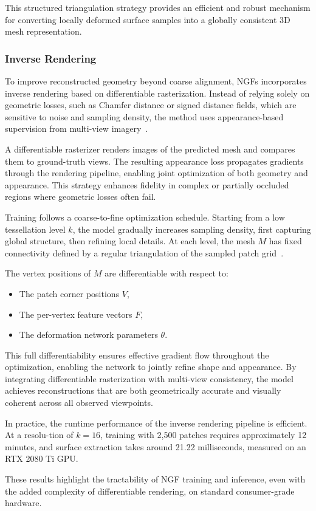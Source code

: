 This structured triangulation strategy provides an efficient and robust mechanism for converting locally deformed surface samples into a globally consistent 3D mesh representation.

\subsubsection{Inverse Rendering}

To improve reconstructed geometry beyond coarse alignment, NGFs incorporates inverse rendering based on differentiable rasterization.
Instead of relying solely on geometric losses, such as Chamfer distance or signed distance fields, which are sensitive to noise and sampling density, the method uses appearance-based supervision from multi-view imagery~\cite{Hasselgren2021}.

A differentiable rasterizer renders images of the predicted mesh and compares them to ground-truth views.
The resulting appearance loss propagates gradients through the rendering pipeline, enabling joint optimization of both geometry and appearance.
This strategy enhances fidelity in complex or partially occluded regions where geometric losses often fail.

Training follows a coarse-to-fine optimization schedule.
Starting from a low tessellation level $k$, the model gradually increases sampling density, first capturing global structure, then refining local details.
At each level, the mesh $M$ has fixed connectivity defined by a regular triangulation of the sampled patch grid~\cite{sivaram2024}.

The vertex positions of $M$ are differentiable with respect to:
\begin{itemize}
    \item The patch corner positions $V$,
    \item The per-vertex feature vectors $F$,
    \item The deformation network parameters $\theta$.
\end{itemize}

This full differentiability ensures effective gradient flow throughout the optimization, enabling the network to jointly refine shape and appearance.
By integrating differentiable rasterization with multi-view consistency, the model achieves reconstructions that are both geometrically accurate and visually coherent across all observed viewpoints.

In practice, the runtime performance of the inverse rendering pipeline is efficient. 
At a resolu-tion of $k = 16$, training with 2,500 patches requires approximately 12 minutes, and surface extraction takes around 21.22 milliseconds, measured on an RTX 2080 Ti GPU.

These results highlight the tractability of NGF training and inference, even with the added complexity of differentiable rendering, on standard consumer-grade hardware.